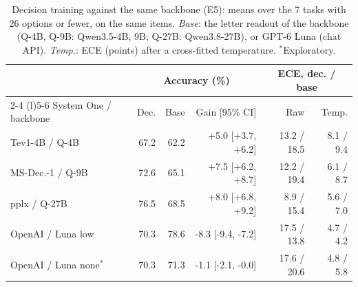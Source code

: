 \begin{table}[t]
\centering
\scriptsize
\setlength{\tabcolsep}{2pt}
\begin{tabular}{@{}lrrrrr@{}}
\toprule
 & \multicolumn{3}{c}{Accuracy (\%)} & \multicolumn{2}{c}{ECE, dec. / base} \\
\cmidrule(lr){2-4} \cmidrule(l){5-6}
System One / backbone & Dec. & Base & Gain [95\% CI] & Raw & Temp. \\
\midrule
Tev1-4B / Q-4B & 67.2 & 62.2 & +5.0 [+3.7, +6.2] & 13.2 / 18.5 & 8.1 / 9.4 \\
MS-Dec.-1 / Q-9B & 72.6 & 65.1 & +7.5 [+6.2, +8.7] & 12.2 / 19.4 & 6.1 / 8.7 \\
pplx / Q-27B & 76.5 & 68.5 & +8.0 [+6.8, +9.2] & 8.9 / 15.4 & 5.6 / 7.0 \\
OpenAI / Luna low & 70.3 & 78.6 & -8.3 [-9.4, -7.2] & 17.5 / 13.8 & 4.7 / 4.2 \\
OpenAI / Luna none$^*$ & 70.3 & 71.3 & -1.1 [-2.1, -0.0] & 17.6 / 20.6 & 4.8 / 5.8 \\
\bottomrule
\end{tabular}
\caption{Decision training against the same backbone (E5): means over the 7 tasks with 26 options or fewer, on the same items. \emph{Base}: the letter readout of the backbone (Q-4B, Q-9B: Qwen3.5-4B, 9B; Q-27B: Qwen3.8-27B), or GPT-6 Luna (chat API). \emph{Temp.}: ECE (points) after a cross-fitted temperature. $^*$Exploratory.}
\label{tab:e5}
\end{table}
